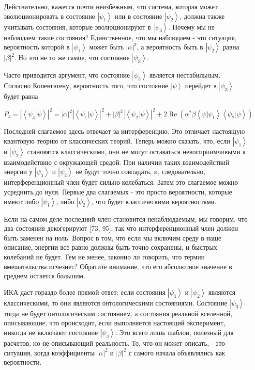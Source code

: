 \documentclass[main.tex]{subfiles}
\begin{document}
Действительно, кажется почти неизбежным, что система, которая может эволюционировать в состояние $\left|\psi_1\right>$ или в состояние $\left|\psi_2\right>$, должна также учитывать состояния, которые эволюционируют в $\left|\psi_3\right>$. Почему мы не наблюдаем такие состояния? Единственное, что мы наблюдаем - это ситуация, вероятность которой в $\left|\psi_1\right>$ может быть $|\alpha|^2$, а вероятность быть в $\left|\psi_2\right>$ равна $|\beta|^2$. Но это не то же самое, что состояние $\left|\psi_3\right>$.

Часто приводится аргумент, что состояние $\left|\psi_3\right>$ является нестабильным. Согласно Копенгагену, вероятность того, что состояние $\left|\psi\right>$ перейдет в $\left|\psi_3\right>$ будет равна

\begin{equation}\label{3.3}
	P_{3}=\left|\left\langle\psi_{3} | \psi\right\rangle\right|^{2}=|\alpha|^{2}\left|\left\langle\psi_{1} | \psi\right\rangle\right|^{2}+|\beta|^{2}\left|\left\langle\psi_{2} | \psi\right\rangle\right|^{2}+2 \operatorname{Re}\left(\alpha^{*} \beta\left\langle\psi | \psi_{1}\right\rangle\left\langle\psi_{2} | \psi\right\rangle\right)
\end{equation}

Последней слагаемое здесь отвечает за интерференцию. Это отличает настоящую квантовую теорию от классических теорий. Теперь можно сказать, что, если $\left|\psi_1\right>$ и $\left|\psi_2\right>$ становятся классическими, они не могут оставаться невосприимчивыми к взаимодействию с окружающей средой. При наличии таких взаимодействий энергии у $\left|\psi_1\right>$ и $\left|\psi_2\right>$ не будут точно совпадать, и, следовательно, интерференционный член будет сильно колебаться. Затем это слагаемое можно усреднить до нуля. Первые два слагаемых - это просто вероятности, которые имеют либо $\left|\psi_1\right>$, либо $\left|\psi_2\right>$, что будет классическими вероятностями.

Если на самом деле последний член становится ненаблюдаемым, мы говорим, что два состояния декогерируют [73, 95], так что интерференционный член должен быть заменен на ноль. Вопрос в том, что если мы включим среду в наше описание, энергии все равно должны быть точно сохранены, и быстрых колебаний не будет. Тем не менее, законно ли говорить, что термин вмешательства исчезнет? Обратите внимание, что его абсолютное значение в среднем остается большим.

ИКА даст гораздо более прямой ответ: если состояния $\left|\psi_1\right>$ и $\left|\psi_2\right>$ являются классическими, то они являются онтологическими состояниями. Состояние $\left|\psi_3\right>$ тогда не будет онтологическим состоянием, а состояния реальной вселенной, описывающие, что происходит, если выполняется настоящий эксперимент, никогда не включают состояние $\left|\psi_3\right>$. Это всего лишь шаблон, полезный для расчетов, но не описывающий реальность. То, что он может описать, - это ситуация, когда коэффициенты $|\alpha|^2$ и $|\beta|^2$ с самого начала объявлялись как вероятности.
\end{document}
